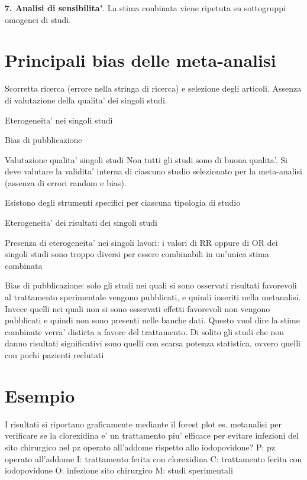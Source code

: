 \documentclass[]{book}
\begin{document}
\textbf{7. Analisi di sensibilita'}. La stima conbinata viene ripetuta su sottogruppi omogenei di studi.

\hypertarget{principali-bias-delle-meta-analisi}{%
\section{Principali bias delle meta-analisi}\label{principali-bias-delle-meta-analisi}}

Scorretta ricerca (errore nella stringa di ricerca) e selezione degli articoli. Assenza di valutazione della qualita' dei singoli studi.

Eterogeneita' nei singoli studi

Bias di pubblicazione

Valutazione qualita' singoli studi
Non tutti gli studi sono di buona qualita'. Si deve valutare la validita' interna di ciascuno studio selezionato per la meta-analisi (assenza di errori random e bias).

Esistono degli strumenti specifici per ciascuna tipologia di studio

Eterogeneita' dei risultati dei singoli studi

Presenza di eterogeneita' nei singoli lavori: i valori di RR oppure di OR dei singoli studi sono troppo diversi per essere combinabili in un'unica stima combinata

Bias di pubblicazione: solo gli studi nei quali si sono osservati risultati favorevoli al trattamento sperimentale vengono pubblicati, e quindi inseriti nella metanalisi.
Invece quelli nei quali non si sono osservati effetti favorevoli non vengono pubblicati e quindi non sono presenti nelle banche dati. Questo vuol dire la stime combinate verra' distirta a favore del trattamento.
Di solito gli studi che non danno risultati significativi sono quelli con scarsa potenza statistica, ovvero quelli con pochi pazienti reclutati

\hypertarget{esempio-2}{%
\section{Esempio}\label{esempio-2}}

I risultati si riportano graficamente mediante il forest plot
es. metanalisi per verificare se la clorexidina e' un trattamento piu' efficace per evitare infezioni del sito chirurgico nel pz operato all'addome rispetto allo iodopovidone?
P: pz operato all'addome
I: trattamento ferita con clorexidina
C: trattamento ferita con iodopovidone O: infezione sito chirurgico
M: studi sperimentali
\end{document}
